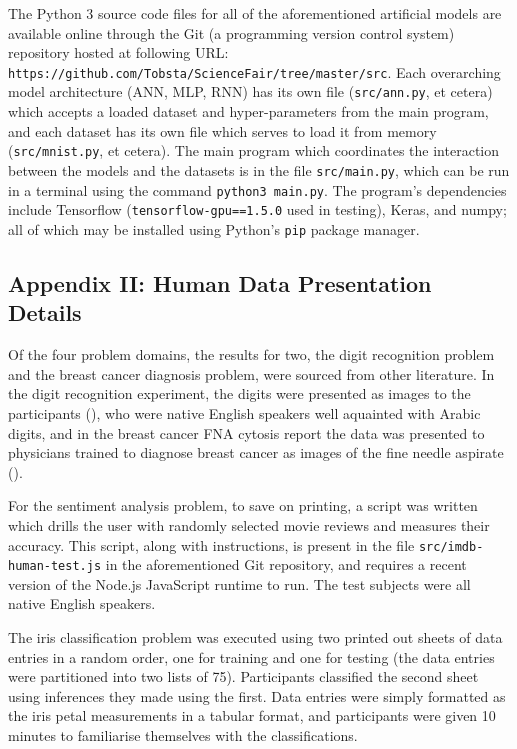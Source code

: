 \documentclass[]{report}
\begin{document}
The Python 3 source code files for all of the aforementioned artificial models are available online through the Git (a programming version control system) repository hosted at following URL: \texttt{https://github.com/Tobsta/ScienceFair/tree/master/src}. Each overarching model architecture (ANN, MLP, RNN) has its own file (\texttt{src/ann.py}, et cetera) which accepts a loaded dataset and hyper-parameters from the main program, and each dataset has its own file which serves to load it from memory (\texttt{src/mnist.py}, et cetera). The main program which coordinates the interaction between the models and the datasets is in the file \texttt{src/main.py}, which can be run in a terminal using the command \texttt{python3 main.py}. The program's dependencies include Tensorflow (\texttt{tensorflow-gpu==1.5.0} used in testing), Keras, and numpy; all of which may be installed using Python's \texttt{pip} package manager.

\label{sec:Appendix_II}
\subsection{Appendix II: Human Data Presentation Details}

Of the four problem domains, the results for two, the digit recognition problem and the breast cancer diagnosis problem, were sourced from other literature. In the digit recognition experiment, the digits were presented as images to the participants (\cite{simard1993efficient}), who were native English speakers well aquainted with Arabic digits, and in the breast cancer FNA cytosis report the data was presented to physicians trained to diagnose breast cancer as images of the fine needle aspirate (\cite{mangasarian1995breast}).

For the sentiment analysis problem, to save on printing, a script was written which drills the user with randomly selected movie reviews and measures their accuracy. This script, along with instructions, is present in the file \texttt{src/imdb-human-test.js} in the aforementioned Git repository, and requires a recent version of the Node.js JavaScript runtime to run. The test subjects were all native English speakers.

The iris classification problem was executed using two printed out sheets of data entries in a random order, one for training and one for testing (the data entries were partitioned into two lists of 75). Participants classified the second sheet using inferences they made using the first. Data entries were simply formatted as the iris petal measurements in a tabular format, and participants were given 10 minutes to familiarise themselves with the classifications.
\end{document}
